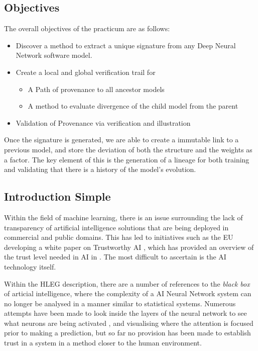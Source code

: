 \subsection{Objectives}
The overall objectives of the practicum are as follows:

\begin{itemize}
    \item Discover a method to extract a unique signature from any Deep Neural Network software model.
    \item Create a local and global verification trail for
    \begin{itemize}
        \item A Path of provenance to all ancestor models
        \item A method to evaluate divergence of the child model from the parent
    \end{itemize}
    \item Validation of Provenance via verification and illustration
\end{itemize}

Once the signature is generated, we are able to create a immutable link to a previous model, and store the deviation of both the structure and the weights as a factor. The key element of this is the generation of a lineage for both training and validating that there is a history of the model's evolution.

\subsection{Introduction Simple}
Within the field of machine learning, there is an issue surrounding the lack of transparency of artificial intelligence solutions that are being deployed in commercial and public domains. This has led to initiatives such as the EU developing a white paper on Trustworthy AI \cite{high-level_expert_group_on_ai_ethics_2019}, which has provided an overview of the trust level needed in AI in \cite{ryan_ai_2020}. The most difficult to ascertain is the AI technology itself.

Within the HLEG description, there are a number of references to the \textit{black box} of articial intelligence, where the complexity of a AI Neural Network system can no longer be analysed in a manner similar to statistical systems. Numerous attempts have been made to look inside the layers of the neural network to see what neurons are being activated \cite{kim_interpretability_2018}, and visualising where the attention is focused prior to making a prediction, but so far no provision has been made to establish trust in a system in a method closer to the human environment.

